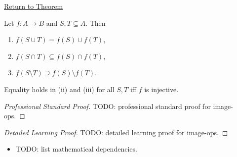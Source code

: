 \newpage
{}
\label{prf:image-ops}

\begin{remark*}[Return]
\hyperref[thm:image-ops]{Return to Theorem}
\end{remark*}

\begin{theorem*}
Let $f : A \to B$ and $S, T \subseteq A$. Then
\begin{enumerate}[label=(\roman*)]
\item $f(S \cup T) = f(S) \cup f(T)$,
\item $f(S \cap T) \subseteq f(S) \cap f(T)$,
\item $f(S \setminus T) \supseteq f(S) \setminus f(T)$.
\end{enumerate}
Equality holds in (ii) and (iii) for all $S,T$ iff $f$ is injective.
\end{theorem*}

\begin{proof}[Professional Standard Proof]
\LRAProofBodyStart
TODO: professional standard proof for image-ops.
\end{proof}

\begin{proof}[Detailed Learning Proof]
\LRAProofBodyStart
TODO: detailed learning proof for image-ops.
\end{proof}

\begin{remark*}
\end{remark*}

\begin{dependencies}
\begin{itemize}
  \item TODO: list mathematical dependencies.
\end{itemize}
\end{dependencies}

\clearpage
